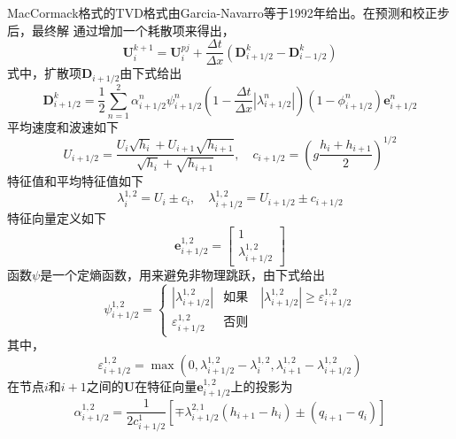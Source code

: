 MacCormack格式的TVD格式由Garcia-Navarro\cite{ref7}等于1992年给出。在预测和校正步后，最终解
通过增加一个耗散项来得出，
\begin{equation}
  \mathbf{U}_{i}^{k+1} =
  \mathbf{U}_{i}^{pj} +
  \frac{\Delta t}{\Delta x}
  \left(
    \mathbf{D}_{i+1/2}^{k} -
    \mathbf{D}_{i-1/2}^{k}
  \right)
\end{equation}
式中，扩散项$\mathbf{D}_{i+1/2}$由下式给出
\begin{equation}
  \mathbf{D}_{i+1/2}^{k} =
  \frac{1}{2}
  \sum_{n=1}^{2}
  \alpha_{i+1/2}^{n}
  \psi_{i+1/2}^{n}
  \left(
    1 - 
    \frac{\Delta t}{\Delta x}
    \left|
    \lambda_{i+1/2}^{n}
    \right|
  \right)
  \left(
    1-\phi_{i+1/2}^{n}
  \right)
  \mathbf{e}_{i+1/2}^{n}
\end{equation}
平均速度和波速如下
\begin{equation}
  U_{i+1/2} = 
  \frac
  {U_{i}\sqrt{h_{i}} + U_{i+1}\sqrt{h_{i+1}}}
  {\sqrt{h_{i}}+\sqrt{h_{i+1}}}
  ,\quad
  c_{i+1/2} =
  \left(
    g 
    \frac{h_{i}+h_{i+1}}{2}
  \right)^{1/2}
\end{equation}
特征值和平均特征值如下
\begin{equation}
  \lambda_{i}^{1,2} = U_{i}\pm c_{i}
  ,\quad
  \lambda_{i+1/2}^{1,2} = U_{i+1/2}\pm c_{i+1/2}
\end{equation}
特征向量定义如下
\begin{equation}
  \mathbf{e}_{i+1/2}^{1,2} 
  =
  \begin{bmatrix}
    1 \\
    \lambda_{i+1/2}^{1,2}
  \end{bmatrix}
\end{equation}
函数$\psi$是一个定熵函数，用来避免非物理跳跃，由下式给出
\begin{equation}
  \psi_{i+1/2}^{1,2} =
  \begin{cases}
    |\lambda_{i+1/2}^{1,2}| & \mbox{如果} \quad |\lambda_{i+1/2}^{1,2}| \ge \varepsilon_{i+1/2}^{1,2} \\
    \varepsilon_{i+1/2}^{1,2} & \mbox{否则} 
  \end{cases}
\end{equation}
其中，
\begin{equation}
\varepsilon_{i+1/2}^{1,2} =
\max 
\left(
  0,
  \lambda_{i+1/2}^{1,2} - \lambda_{i}^{1,2},
  \lambda_{i+1}^{1,2} - \lambda_{i+1/2}^{1,2}
\right)
\end{equation}
在节点$i$和$i+1$之间的$\mathbf{U}$在特征向量$\mathbf{e}_{i+1/2}^{1,2}$上的投影为
\begin{equation}
\alpha_{i+1/2}^{1,2} = 
\frac{1}{2c_{i+1/2}^{1}}
\left[
  \mp\lambda_{i+1/2}^{2,1}(h_{i+1}-h_{i})
  \pm
  (q_{i+1} - q_{i})
\right]
\end{equation}
